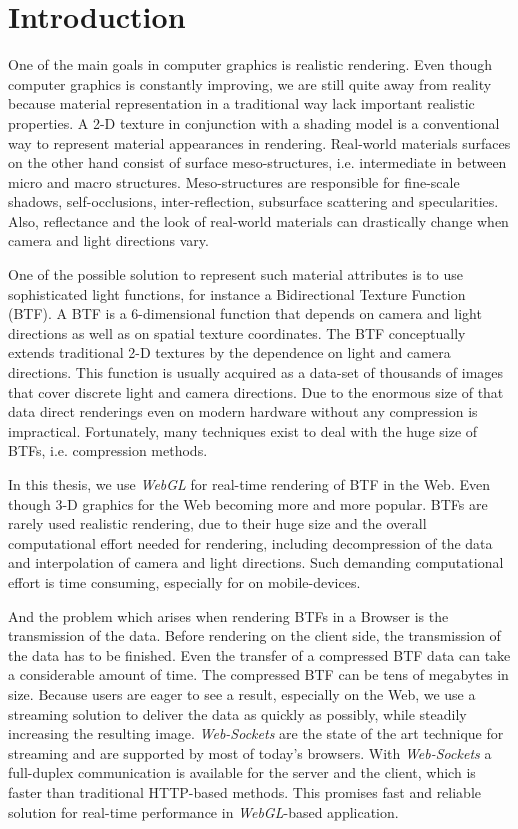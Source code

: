 \chapter{Introduction}
\label{chapter:introduction}

One of the main goals in computer graphics is realistic rendering. 
Even though computer graphics is constantly improving, we are still quite away from reality because material representation in a traditional way lack important realistic properties. 
A 2-D texture in conjunction with a shading model is a conventional way to represent material appearances in rendering.
Real-world materials surfaces on the other hand consist of surface meso-structures, i.e. intermediate in between micro and macro structures.
Meso-structures are responsible for fine-scale shadows, self-occlusions, inter-reflection, subsurface scattering and specularities.
Also, reflectance and the look of real-world materials can drastically change when camera and light directions vary.

One of the possible solution to represent such material attributes is to use sophisticated light functions, for instance a Bidirectional Texture Function (BTF). 
 A BTF is a 6-dimensional function that depends on camera and light directions as well as on spatial texture coordinates. 
The BTF conceptually extends traditional 2-D textures by the dependence on light and camera directions.
This function is usually acquired as a data-set of thousands of images that cover discrete light and camera directions.
Due to the enormous size of that data direct renderings even on modern hardware without any compression is impractical.
Fortunately, many techniques exist to deal with the huge size of BTFs, i.e. compression methods.


In this thesis, we use \emph{WebGL} for real-time rendering of BTF in the Web.
Even though 3-D graphics for the Web becoming more and more popular. BTFs are rarely used realistic rendering, due to their huge size and the overall computational effort needed for rendering,
including decompression of the data and interpolation of camera and light directions.
Such demanding computational effort is time consuming, especially for on mobile-devices.

And the problem which arises when rendering BTFs in a Browser is the transmission of the data.
Before rendering on the client side, the transmission of the data has to be finished.
Even the transfer of a compressed BTF data can take a considerable amount of time. 
The compressed BTF can be tens of megabytes in size.
Because users are eager to see a result, especially on the Web, we use a streaming solution to deliver the data as quickly as possibly, while steadily increasing the resulting image.
 \emph{Web-Sockets} are the state of the art technique for streaming and are supported by most of today's browsers.
With \emph{Web-Sockets}  a  full-duplex communication is available for the server and the client, which is faster than traditional HTTP-based methods. 
This promises fast and reliable solution for real-time performance in \emph{WebGL}-based application.

